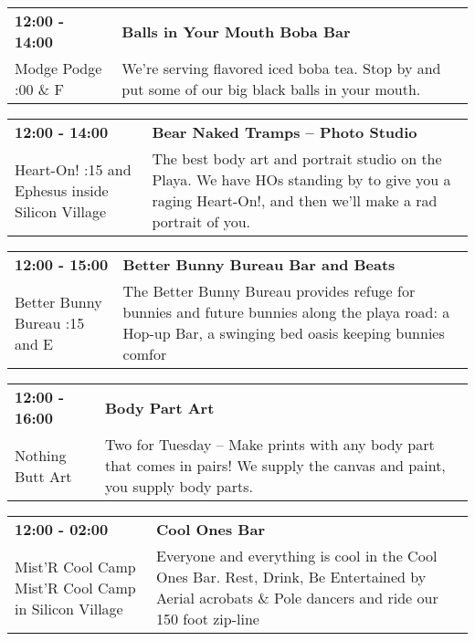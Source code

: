 \begin{tabular}{ p{1in} p{2.2in} }
    \textbf{12:00 - 14:00} & \textbf{Balls in Your Mouth Boba Bar} \\
    Modge Podge \newline 9:00 \& F & We're serving flavored iced boba tea.  Stop by and put some of our big black balls in your mouth. \\
    \hline 
\end{tabular}
    
\begin{tabular}{ p{1in} p{2.2in} }
    \textbf{12:00 - 14:00} & \textbf{Bear Naked Tramps -- Photo Studio} \\
    Heart-On! \newline 6:15 and Ephesus inside Silicon Village & The best body art and portrait studio on the Playa. We have HOs standing by to give you a raging Heart-On!, and then we'll make a rad portrait of you. \\
    \hline 
\end{tabular}
    
\begin{tabular}{ p{1in} p{2.2in} }
    \textbf{12:00 - 15:00} & \textbf{Better Bunny Bureau Bar and Beats} \\
    Better Bunny Bureau \newline 4:15 and E & The Better Bunny Bureau provides refuge for bunnies and future bunnies along the playa road: a Hop-up Bar, a swinging bed oasis keeping bunnies comfor \\
    \hline 
\end{tabular}
    
\begin{tabular}{ p{1in} p{2.2in} }
    \textbf{12:00 - 16:00} & \textbf{Body Part Art} \\
    Nothing Butt Art \newline  & Two for Tuesday -- Make prints with any body part that comes in pairs! We supply the canvas and paint, you supply body parts. \\
    \hline 
\end{tabular}
    
\begin{tabular}{ p{1in} p{2.2in} }
    \textbf{12:00 - 02:00} & \textbf{Cool Ones Bar } \\
    Mist'R Cool Camp \newline Mist'R Cool Camp in Silicon Village & Everyone and everything is cool in the Cool Ones Bar. Rest, Drink, Be Entertained by Aerial acrobats \& Pole dancers and ride our 150 foot zip-line \\
    \hline 
\end{tabular}
    
